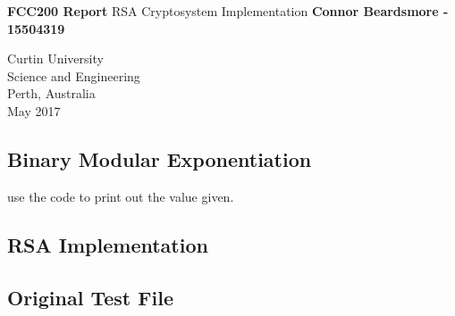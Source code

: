 \documentclass[]{article}
\begin{document}



\begin{titlepage}
	\begin{center}
		\vspace*{1cm}
		\LARGE\textbf{FCC200 Report}
		\break
		RSA Cryptosystem Implementation
		\vspace{1cm}
		\break
		\Large\textbf{Connor Beardsmore - 15504319} 
		\vspace{15cm}

		\normalsize
		Curtin University \\
		Science and Engineering \\
		Perth, Australia \\
	    May 2017
	    
	\end{center}
\end{titlepage}

\vspace*{-0.8cm}
\begin{center}
	\section*{Binary Modular Exponentiation}
\end{center}

{}

use the code to print out the value given.

\pagebreak

\vspace*{-0.8cm}
\begin{center}
	\section*{RSA Implementation}
\end{center}

\subsection*{Original Test File}
\end{document}
